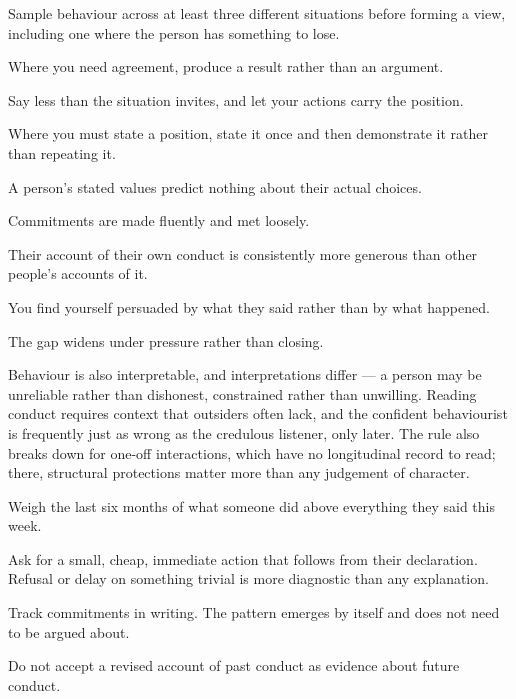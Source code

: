 \begin{application}
  \item Sample behaviour across at least three different situations before forming a view, including one where the person has something to lose.
  \item Where you need agreement, produce a result rather than an argument.
  \item Say less than the situation invites, and let your actions carry the position.
  \item Where you must state a position, state it once and then demonstrate it rather than repeating it.
\end{application}

\begin{feedback}
  \item A person's stated values predict nothing about their actual choices.
  \item Commitments are made fluently and met loosely.
  \item Their account of their own conduct is consistently more generous than other people's accounts of it.
  \item You find yourself persuaded by what they said rather than by what happened.
  \item The gap widens under pressure rather than closing.
\end{feedback}

\begin{failure}
Behaviour is also interpretable, and interpretations differ --- a person may be unreliable rather than dishonest, constrained rather than unwilling. Reading conduct requires context that outsiders often lack, and the confident behaviourist is frequently just as wrong as the credulous listener, only later. The rule also breaks down for one-off interactions, which have no longitudinal record to read; there, structural protections matter more than any judgement of character.
\end{failure}

\begin{countermeasures}
  \item Weigh the last six months of what someone did above everything they said this week.
  \item Ask for a small, cheap, immediate action that follows from their declaration. Refusal or delay on something trivial is more diagnostic than any explanation.
  \item Track commitments in writing. The pattern emerges by itself and does not need to be argued about.
  \item Do not accept a revised account of past conduct as evidence about future conduct.
\end{countermeasures}

\seesources
{}
